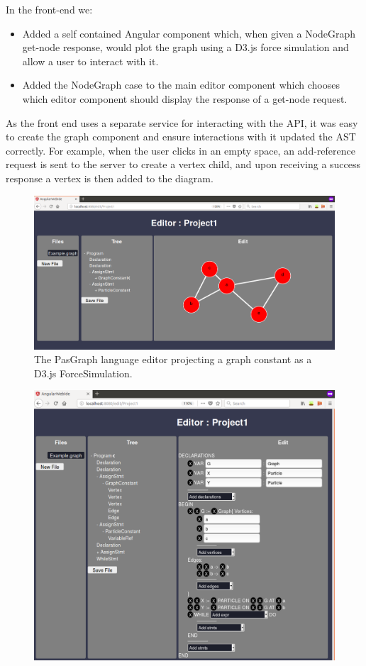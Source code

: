 \documentclass{article}
\begin{document}
{\begin{itemize}
\end{itemize}
In the front-end we:
\begin{itemize}
\item Added a self contained Angular component which, when given a NodeGraph get-node response, would plot the graph using a D3.js force simulation and allow a user to interact with it.
\item Added the NodeGraph case to the main editor component which chooses which editor component should display the response of a get-node request.
\end{itemize}
As the front end uses a separate service for interacting with the API, it was easy to create the graph component and ensure interactions with it updated the AST correctly. For example, when the user clicks in an empty space, an add-reference request is sent to the server to create a vertex child, and upon receiving a success response a vertex is then added to the diagram.
\begin{figure}[h!]
  \centering
  \includegraphics[width=\linewidth]{./Screenshots/graphUIgraph2narrow.png}
  \caption{The PasGraph language editor projecting a graph constant as a D3.js ForceSimulation.}
  \label{fig:pasgraphUI2}
\end{figure}
\begin{figure}[h!]
  \centering
  \includegraphics[width=\linewidth]{./Screenshots/graphUI3Narrow2.png}

\end{figure}}
\end{document}
